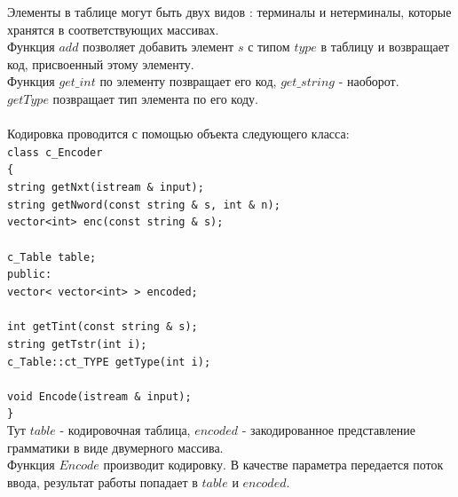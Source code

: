\documentclass[12pt]{article}
\newcommand\tab[1][1cm]{\hspace*{#1}}
\begin{document}
Элементы в таблице могут быть двух видов : терминалы и нетерминалы, которые хранятся в соответствующих массивах. \\
Функция $add$ позволяет добавить элемент $s$ с типом $type$ в таблицу и возвращает код, присвоенный этому элементу.\\
Функция $get\_int$ по элементу позвращает его код, $get\_string$ - наоборот.\\
$getType$ позвращает тип элемента по его коду.\\
\\

Кодировка проводится с помощью объекта следующего класса:
\\
\texttt{class c\_Encoder\\
\{\\
\tab	string getNxt(istream \& input);\\
\tab	string getNword(const string \& s, int \& n);\\
\tab	vector<int> enc(const string \& s);\\
\\
\tab	c\_Table table;\\
public:\\
\tab	vector< vector<int> > encoded;\\
\\
\tab	int getTint(const string \& s);\\
\tab	string getTstr(int i);\\
\tab	c\_Table::ct\_TYPE getType(int i);\\
\\
\tab	void Encode(istream \& input);\\
\}
}
\\

Тут $table$ - кодировочная таблица, $encoded$ - закодированное представление грамматики в виде двумерного массива.\\
Функция $Encode$ производит кодировку. В качестве параметра передается поток ввода, результат работы попадает в $table$ и $encoded$.
\\
\end{document}
